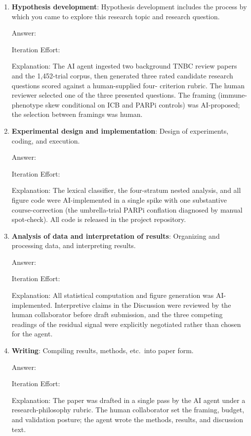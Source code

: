 \documentclass{article}
\begin{document}
\begin{enumerate}

  \item \textbf{Hypothesis development}: Hypothesis development includes
  the process by which you came to explore this research topic and
  research question.

  Answer: \involvementC{}

  Iteration Effort: \iterationLow{}

  Explanation: The AI agent ingested two background TNBC review
  papers and the 1{,}452-trial corpus, then generated three rated
  candidate research questions scored against a human-supplied four-
  criterion rubric.  The human reviewer selected one of the three
  presented questions.  The framing (immune-phenotype skew
  conditional on ICB and PARPi controls) was AI-proposed; the
  selection between framings was human.

  \item \textbf{Experimental design and implementation}: Design of
  experiments, coding, and execution.

  Answer: \involvementD{}

  Iteration Effort: \iterationLow{}

  Explanation: The lexical classifier, the four-stratum nested
  analysis, and all figure code were AI-implemented in a single
  spike with one substantive course-correction (the umbrella-trial
  PARPi conflation diagnosed by manual spot-check).  All code is
  released in the project repository.

  \item \textbf{Analysis of data and interpretation of results}:
  Organizing and processing data, and interpreting results.

  Answer: \involvementC{}

  Iteration Effort: \iterationLow{}

  Explanation: All statistical computation and figure generation
  was AI-implemented.  Interpretive claims in the Discussion were
  reviewed by the human collaborator before draft submission, and
  the three competing readings of the residual signal were
  explicitly negotiated rather than chosen for the agent.

  \item \textbf{Writing}: Compiling results, methods, etc.\ into
  paper form.

  Answer: \involvementC{}

  Iteration Effort: \iterationLow{}

  Explanation: The paper was drafted in a single pass by the AI
  agent under a research-philosophy rubric.  The human collaborator
  set the framing, budget, and validation posture; the agent wrote
  the methods, results, and discussion text.

\end{enumerate}
\end{document}
